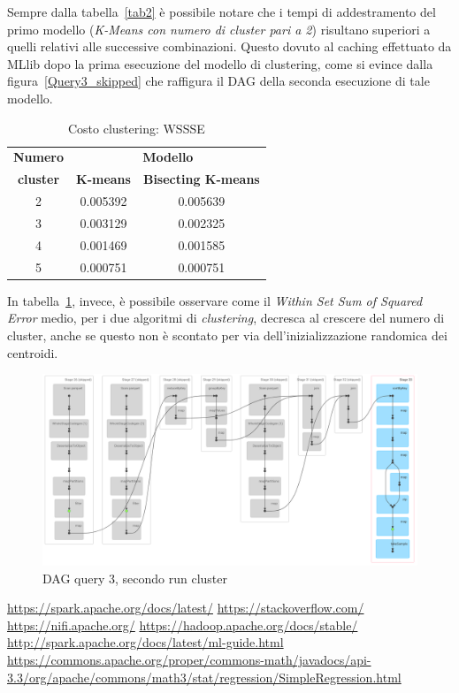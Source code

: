 \documentclass[conference]{IEEEtran}
\begin{document}
\par Sempre dalla tabella~\ref{tab2} \`{e} possibile notare che i tempi di addestramento del primo modello (\emph{K-Means con numero di cluster pari a 2}) risultano superiori a quelli relativi alle successive combinazioni. Questo dovuto al caching effettuato da MLlib dopo la prima esecuzione del modello di clustering, come si evince dalla figura~\ref{Query3_skipped} che raffigura il DAG della seconda esecuzione di tale modello. 
\begin{table}[htbp]
\caption{Costo clustering: WSSSE}
\begin{center}
\begin{tabular}{|c|c|c|}
\hline
\textbf{Numero}&\multicolumn{2}{|c|}{\textbf{Modello}} \\ \cline{2-3}
\textbf{cluster} & \multicolumn{1}{|c|}{\textbf{K-means}} & \multicolumn{1}{|c|}{\textbf{Bisecting K-means}} \\ \hline
2 & 0.005392 & 0.005639 \\ \hline
3 & 0.003129 & 0.002325 \\ \hline
4 & 0.001469 & 0.001585 \\ \hline
5 & 0.000751 & 0.000751 \\ \hline
\end{tabular}
\label{tab3}
\end{center}
\end{table}
\par In tabella~\ref{tab3}, invece, \`{e} possibile osservare come il \emph{Within Set Sum of Squared Error} medio, per i due algoritmi di \emph{clustering}, decresca al crescere del numero di cluster, anche se questo non \`{e} scontato per via dell'inizializzazione randomica dei centroidi. 
\begin{figure}[htbp]
\includegraphics[scale=0.196]{Screenshot/Query3_skipped.png}
\caption{DAG query 3, secondo run cluster}\label{Query3_skipped}
\label{fig}
\end{figure}


\begin{thebibliography}{00}
 \url{https://spark.apache.org/docs/latest/}
 \url{https://stackoverflow.com/}
 \url{https://nifi.apache.org/}
 \url{https://hadoop.apache.org/docs/stable/}
 \url{http://spark.apache.org/docs/latest/ml-guide.html}
 \url{https://commons.apache.org/proper/commons-math/javadocs/api-3.3/org/apache/commons/math3/stat/regression/SimpleRegression.html}
\end{thebibliography}
\end{document}
